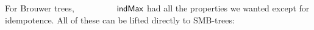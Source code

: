 For Brouwer trees, $\indMax$ had all the properties we wanted
except for idempotence. All of these can be lifted directly to
SMB-trees:

\begin{code}%
%
\>[2]\AgdaSpace{}%
\AgdaSymbol{:}\AgdaSpace{}%
\AgdaSpace{}%
\AgdaSymbol{\{}\AgdaSpace{}%
\AgdaSymbol{\}}\AgdaSpace{}%
\AgdaSpace{}%
\AgdaSpace{}%
\AgdaSpace{}%
\AgdaSpace{}%
\AgdaSpace{}%
\<%
\\
%
\\[\AgdaEmptyExtraSkip]%
%
\>[2]\AgdaSpace{}%
\AgdaSymbol{:}\AgdaSpace{}%
\AgdaSpace{}%
\AgdaSymbol{\{}\AgdaSpace{}%
\AgdaSymbol{\}}\AgdaSpace{}%
\AgdaSpace{}%
\AgdaSpace{}%
\AgdaSpace{}%
\AgdaSpace{}%
\AgdaSpace{}%
\<%
\\
%
\\[\AgdaEmptyExtraSkip]%
%
\>[2]\AgdaSpace{}%
\AgdaSymbol{:}\AgdaSpace{}%
\AgdaSpace{}%
\AgdaSymbol{\{}\AgdaSpace{}%
\AgdaSpace{}%
\AgdaSpace{}%
\AgdaSymbol{\}}\AgdaSpace{}%
\AgdaSpace{}%
\AgdaSpace{}%
\AgdaSpace{}%
\AgdaSpace{}%
\AgdaSpace{}%
\AgdaSpace{}%
\AgdaSpace{}%
\AgdaSpace{}%
\<%
\\
\>[2][@{}l@{\AgdaIndent{0}}]%
\>[4]\AgdaSpace{}%
\AgdaSpace{}%
\AgdaSpace{}%
\AgdaSpace{}%
\AgdaSpace{}%
\AgdaSpace{}%
\<%
\\
%
\\[\AgdaEmptyExtraSkip]%
%
\>[2]\AgdaSpace{}%
\AgdaSymbol{:}\AgdaSpace{}%
\AgdaSpace{}%
\AgdaSymbol{\{}\AgdaSymbol{\}}\AgdaSpace{}%
\AgdaSpace{}%
\AgdaSpace{}%
\AgdaSpace{}%
\AgdaSpace{}%
\AgdaSpace{}%
\<%
\\
%
\\[\AgdaEmptyExtraSkip]%
%
\>[2]\AgdaSpace{}%
\AgdaSymbol{:}\AgdaSpace{}%

\end{code}
